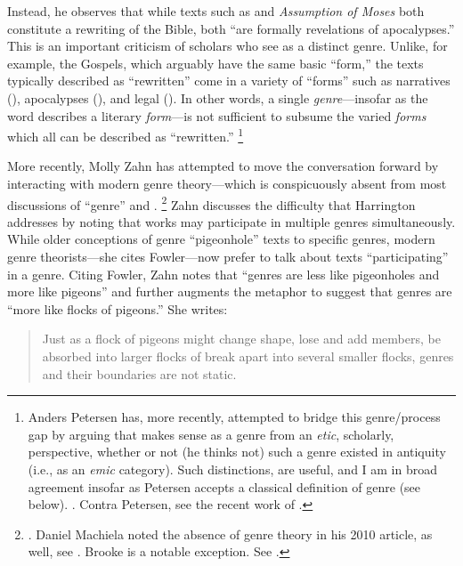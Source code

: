 Instead, he observes that while texts such as \jub and \emph{Assumption of Moses} both constitute a rewriting of the Bible, both ``are formally revelations of apocalypses.''%
    \autocite[243]{harrington_kraft-nickelsburg1986}
This is an important criticism of scholars who see \rwb as a distinct genre. Unlike, for example, the Gospels, which arguably have the same basic ``form,'' the texts typically described as ``rewritten'' come in a variety of ``forms'' such as narratives (\ga), apocalypses (\jub), and legal (\templescroll). In other words, a single \emph{genre}---insofar as the word describes a literary \emph{form}---is not sufficient to subsume the varied \emph{forms} which all can be described as ``rewritten.''%
    \footnote{Anders Petersen has, more recently, attempted to bridge this genre/process gap by arguing that \rwb makes sense as a genre from an \emph{etic}, scholarly, perspective, whether or not (he thinks not) such a genre existed in antiquity (i.e., as an \emph{emic} category). Such distinctions, are useful, and I am in broad agreement insofar as Petersen accepts a classical definition of genre (see below). \cite{petersen_hilhorst-puech2007}. Contra Petersen, see the recent work of \cite{tino_jsj2018}.}

More recently, Molly Zahn has attempted to move the conversation forward by interacting with modern genre theory---which is conspicuously absent from most discussions of ``genre'' and \rwb.%
    \footnote{\cite{zahn_jbl2012}. Daniel Machiela noted the absence of genre theory in his 2010 article, as well, see \cite{machiela_jjs2010}. Brooke is a notable exception. See \cite{brooke_dsd2010}.}
Zahn discusses the difficulty that Harrington addresses by noting that works may participate in multiple genres simultaneously. While older conceptions of genre ``pigeonhole'' texts to specific genres, modern genre theorists---she cites Fowler---now prefer to talk about texts ``participating'' in a genre. Citing Fowler, Zahn notes that ``genres are less like pigeonholes and more like pigeons'' and further augments the metaphor to suggest that genres are ``more like flocks of pigeons.'' She writes: 

\begin{quote}
    Just as a flock of pigeons might change shape, lose and add members, be absorbed into larger flocks of break apart into several smaller flocks, genres and their boundaries are not static.%
    \autocite[277]{zahn_jbl2012}
\end{quote} 

